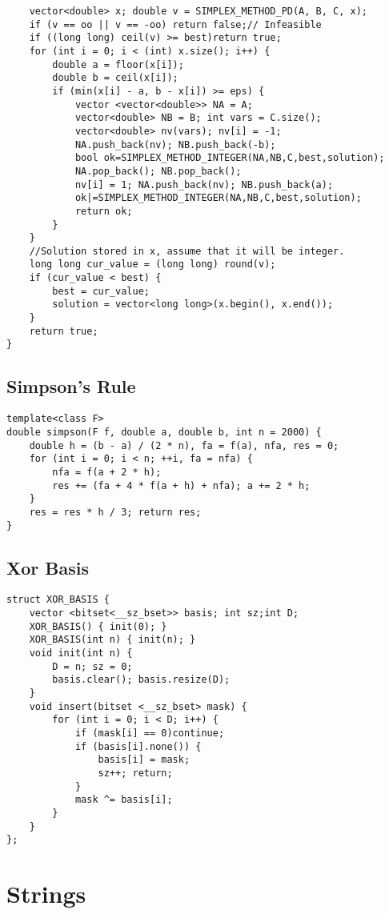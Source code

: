 \documentclass[landscape, 8pt, a4paper, oneside]{extarticle}
\begin{document}
\begin{multicols}{3}
\begin{verbatim}
    vector<double> x; double v = SIMPLEX_METHOD_PD(A, B, C, x);
    if (v == oo || v == -oo) return false;// Infeasible
    if ((long long) ceil(v) >= best)return true;
    for (int i = 0; i < (int) x.size(); i++) {
        double a = floor(x[i]);
        double b = ceil(x[i]);
        if (min(x[i] - a, b - x[i]) >= eps) {
            vector <vector<double>> NA = A;
            vector<double> NB = B; int vars = C.size();
            vector<double> nv(vars); nv[i] = -1;
            NA.push_back(nv); NB.push_back(-b);
            bool ok=SIMPLEX_METHOD_INTEGER(NA,NB,C,best,solution);
            NA.pop_back(); NB.pop_back();
            nv[i] = 1; NA.push_back(nv); NB.push_back(a);
            ok|=SIMPLEX_METHOD_INTEGER(NA,NB,C,best,solution);
            return ok;
        }
    }
    //Solution stored in x, assume that it will be integer.
    long long cur_value = (long long) round(v);
    if (cur_value < best) {
        best = cur_value;
        solution = vector<long long>(x.begin(), x.end());
    }
    return true;
}
\end{verbatim}
\subsection{Simpson's Rule}
\begin{verbatim}
template<class F>
double simpson(F f, double a, double b, int n = 2000) {
    double h = (b - a) / (2 * n), fa = f(a), nfa, res = 0;
    for (int i = 0; i < n; ++i, fa = nfa) {
        nfa = f(a + 2 * h);
        res += (fa + 4 * f(a + h) + nfa); a += 2 * h;
    }
    res = res * h / 3; return res;
}
\end{verbatim}
\subsection{Xor Basis}
\begin{verbatim}
struct XOR_BASIS {
    vector <bitset<__sz_bset>> basis; int sz;int D;
    XOR_BASIS() { init(0); }
    XOR_BASIS(int n) { init(n); }
    void init(int n) {
        D = n; sz = 0;
        basis.clear(); basis.resize(D);
    }
    void insert(bitset <__sz_bset> mask) {
        for (int i = 0; i < D; i++) {
            if (mask[i] == 0)continue;
            if (basis[i].none()) {
                basis[i] = mask;
                sz++; return;
            }
            mask ^= basis[i];
        }
    }
};
\end{verbatim}
\section{Strings}

\end{multicols}
\end{document}

